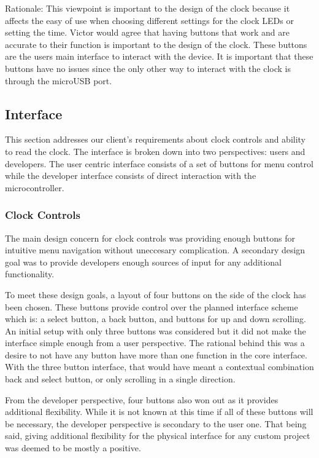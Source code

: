 \documentclass[10pt,draftclsnofoot,onecolumn]{IEEEtran}
\begin{document}
\hfill \break \indent Rationale: This viewpoint is important to the design of the clock because it affects the easy of use when choosing different settings for the clock LEDs or setting the time.
Victor would agree that having buttons that work and are accurate to their function is important to the design of the clock.
These buttons are the users main interface to interact with the device.
It is important that these buttons have no issues since the only other way to interact with the clock is through the microUSB port.

\subsection{Interface}
This section addresses our client's requirements about clock controls and ability to read the clock.
The interface is broken down into two perspectives: users and developers.
The user centric interface consists of a set of buttons for menu control while the developer interface consists of direct interaction with the microcontroller.

\subsubsection{Clock Controls}

\hfill \break \indent The main design concern for clock controls was providing enough buttons for intuitive menu navigation without uneccesary complication.
A secondary design goal was to provide developers enough sources of input for any additional functionality.

\hfill \break \indent To meet these design goals, a layout of four buttons on the side of the clock has been chosen.
These buttons provide control over the planned interface scheme which is: a select button, a back button, and buttons for up and down scrolling.
An initial setup with only three buttons was considered but it did not make the interface simple enough from a user perspective.
The rational behind this was a desire to not have any button have more than one function in the core interface.
With the three button interface, that would have meant a contextual combination back and select button, or only scrolling in a single direction.

\hfill \break \indent From the developer perspective, four buttons also won out as it provides additional flexibility.
While it is not known at this time if all of these buttons will be necessary, the developer perspective is secondary to the user one.
That being said, giving additional flexibility for the physical interface for any custom project was deemed to be mostly a positive.
\end{document}

